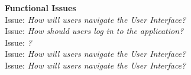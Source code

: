 \textbf{Functional Issues}
\\
Issue: \textit{How will users navigate the User Interface?}
\\

Issue: \textit{How should users log in to the application?}
\\

Issue: \textit{?}
\\

Issue: \textit{How will users navigate the User Interface?}
\\

Issue: \textit{How will users navigate the User Interface?}
\\
